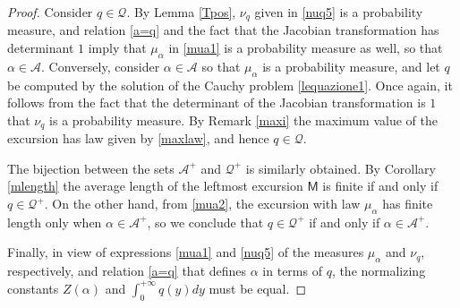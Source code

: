 \documentclass[10pt,a4paper]{amsart}
\newcommand{\sM}{\mathsf{M}}
\begin{document}
\begin{proof}
Consider $q\in \mathscr Q$. By Lemma \ref{Tpos}, $\nu_q$ given in \eqref{nuq5} is a probability measure, and relation \eqref{a=q} and the fact that the Jacobian transformation has determinant $1$ imply that $\mu_{\alpha}$ in \eqref{mua1} is a probability measure as well, so that $\alpha\in \mathcal A$. Conversely, consider $\alpha\in \mathcal A$ so that $\mu_{\alpha}$ is a probability measure, and let $q$ be computed by the solution of the Cauchy problem \eqref{lequazione1}. Once again, it follows from the fact that the determinant of the Jacobian transformation is $1$ that $\nu_q$ is a probability measure. By Remark \ref{maxi} the maximum value of the excursion has law given by \eqref{maxlaw}, and hence $q\in \mathscr Q$.
	
The bijection between the sets $\mathcal A^+$ and $\mathscr Q^+$ is similarly obtained. By Corollary \ref{mlength} the average length of the leftmost excursion $\sM$ is finite if and only if 
$q\in \mathscr Q^+$. On the other hand, from \eqref{mua2}, the excursion with law $\mu_\alpha$ has finite length only when $\alpha \in \mathcal A^+$, so we conclude that $q\in \mathscr Q^+$ if and only if $\alpha \in \mathcal A^+$.

Finally, in view of expressions \eqref{mua1} and \eqref{nuq5} of the measures $\mu_\alpha$ and $\nu_q$, respectively, and relation \eqref{a=q} that defines $\alpha$ in terms of $q$, the normalizing constants $Z(\alpha)$ and $\int_0^{+\infty} q(y)dy$ must be equal. \end{proof}
\end{document}
